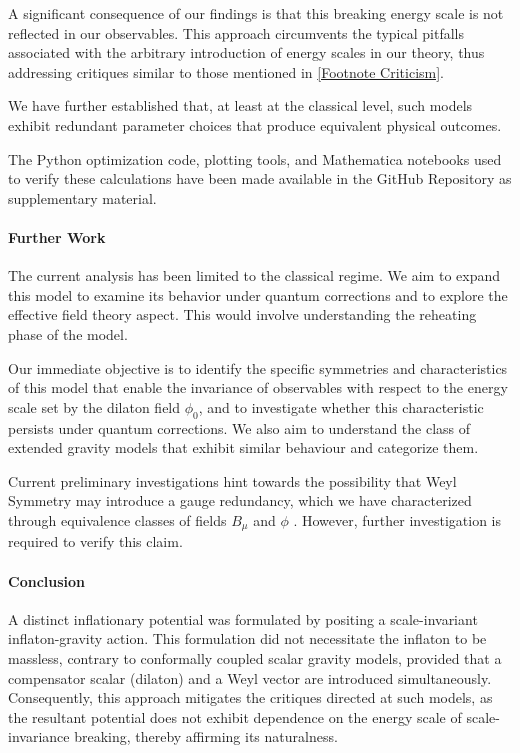 \documentclass[aps,prd,reprint,preprintnumbers,showpacs,floatfix,nofootinbib,superscript address]{revtex4-2}
\begin{document}
 A significant consequence of our findings is that this breaking energy scale is not reflected in our observables. This approach circumvents the typical pitfalls associated with the arbitrary introduction of energy scales in our theory, thus addressing critiques similar to those mentioned in \cref{Footnote Criticism}. 

We have further established that, at least at the classical level, such models exhibit redundant parameter choices that produce equivalent physical outcomes. 

The Python optimization code, plotting tools, and Mathematica notebooks used to verify these calculations have been made available in the GitHub Repository as supplementary material.

\paragraph*{Further Work} 
The current analysis has been limited to the classical regime. We aim to expand this model to examine its behavior under quantum corrections and to explore the effective field theory aspect. This would involve understanding the reheating phase of the model.

Our immediate objective is to identify the specific symmetries and characteristics of this model that enable the invariance of observables with respect to the energy scale set by the dilaton field $\phi_0$, and to investigate whether this characteristic persists under quantum corrections. We also aim to understand the class of extended gravity models that exhibit similar behaviour and categorize them.

Current preliminary investigations hint towards the possibility that Weyl Symmetry may introduce a gauge redundancy, which we have characterized through equivalence classes of fields $B_\mu$ and $\phi$ \cite{jackiw_fake_2015, hertzberg_inflation_2015}. However, further investigation is required to verify this claim.

\paragraph*{Conclusion}
A distinct inflationary potential was formulated by positing a scale-invariant inflaton-gravity action. This formulation did not necessitate the inflaton to be massless, contrary to conformally coupled scalar gravity models, provided that a compensator scalar (dilaton) and a Weyl vector are introduced simultaneously. Consequently, this approach mitigates the critiques directed at such models, as the resultant potential does not exhibit dependence on the energy scale of scale-invariance breaking, thereby affirming its naturalness.
\end{document}
